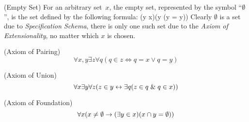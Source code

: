 \begin{definition}{(Empty Set)}\label{def:emptyset}
For an arbitrary set~$x$, the empty set, represented by the symbol ``$\emptyset$'', is the set defined by the following formula:
\beq
(\forall y \in x)(y \in \emptyset \iff \neg(y = y))
\eeq
Clearly $\emptyset$ is a set due to \emph{Specification Schema}, there is only one such set due to the \emph{Axiom of Extensionality}, no matter which $x$ is chosen. 
\end{definition}

\begin{definition}{(Axiom of Pairing)}\label{def:pairing}
\begin{equation}
\forall x, y \exists z \forall q (q \in z \iff q = x \lor q = y) %
\end{equation}
\end{definition}

\begin{definition}{(Axiom of Union)}\label{def:union}
\begin{equation}
\forall x \exists y \forall z (z \in y \iff \exists q( z \in q \et q \in x)) %
\end{equation}
\end{definition}

%

\begin{definition}{(Axiom of Foundation)}\label{def:foundation}
\begin{equation}
\forall x (x \neq \emptyset \then (\exists y \in x) (x \cap y = \emptyset)) %
\end{equation}
\end{definition}

